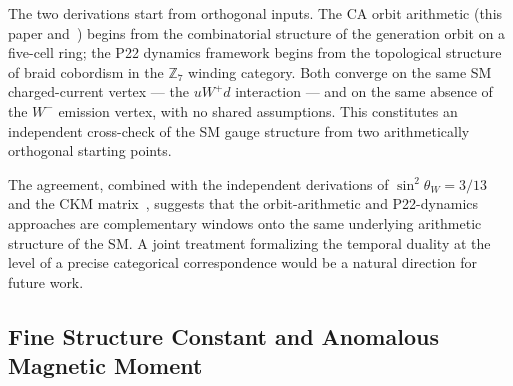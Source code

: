 \documentclass[11pt]{article}
\theoremstyle{remark}
\newcommand{\sinwsq}{\sin^2\!\theta_W}
\begin{document}
The two derivations start from orthogonal inputs.
The CA orbit arithmetic (this paper and~\cite{SpivackCompUniversality}) begins from the
combinatorial structure of the generation orbit on a five-cell ring;
the P22 dynamics framework begins from the topological structure of braid cobordism in
the $\mathbb{Z}_7$ winding category.
Both converge on the same SM charged-current vertex --- the $uW^+d$ interaction --- and
on the same absence of the $W^-$ emission vertex, with no shared assumptions.
This constitutes an independent cross-check of the SM gauge structure from two
arithmetically orthogonal starting points.

The agreement, combined with the independent derivations of
$\sinwsq = 3/13$~\cite{SpivackWeinberg} and the CKM matrix~\cite{SpivackCKM},
suggests that the orbit-arithmetic and P22-dynamics approaches are complementary
windows onto the same underlying arithmetic structure of the SM.
A joint treatment formalizing the temporal duality at the level of a precise
categorical correspondence would be a natural direction for future work.

\subsection{Fine Structure Constant and Anomalous Magnetic Moment}
\label{sec:alpha_gm2}
\end{document}
